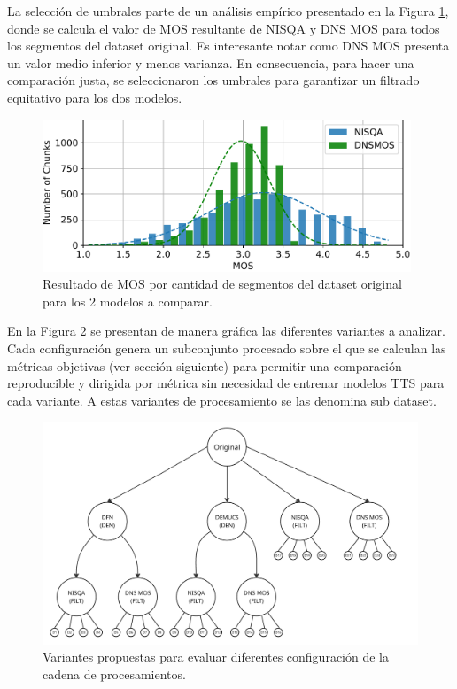 La selección de umbrales parte de un análisis empírico presentado en la Figura \ref{fig:original_mos}, donde se calcula el valor de MOS resultante de NISQA y DNS MOS para todos los segmentos del dataset original. Es interesante notar como DNS MOS presenta un valor medio inferior y menos varianza. En consecuencia, para hacer una comparación justa, se seleccionaron los umbrales para garantizar un filtrado equitativo para los dos modelos.

\begin{figure}[h]
  \centering
  \centerline{\includegraphics[width=11cm]{Figuras/Desarrollo/mos_pred_dist.pdf}}
  \caption{Resultado de MOS por cantidad de segmentos del dataset original para los 2 modelos a comparar.}
    \label{fig:original_mos}
\end{figure}

En la Figura \ref{fig:pipeline_variants} se presentan de manera gráfica las diferentes variantes a analizar. Cada configuración genera un subconjunto procesado sobre el que se calculan las métricas objetivas (ver sección siguiente) para permitir una comparación reproducible y dirigida por métrica sin necesidad de entrenar modelos TTS para cada variante. A estas variantes de procesamiento se las denomina sub dataset.

\begin{figure}[h]
  \centering
  \centerline{\includegraphics[width=15cm]{Figuras/Desarrollo/variantes_diagrama.PNG}}
  \caption{Variantes propuestas para evaluar diferentes configuración de la cadena de procesamientos.}
    \label{fig:pipeline_variants}
\end{figure}

